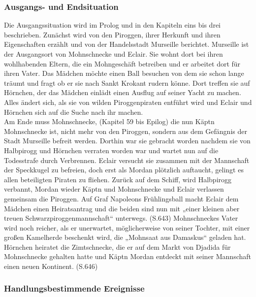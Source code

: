 \subsubsection{Ausgangs- und Endsituation}
Die Ausgangssituation wird im Prolog und in den Kapiteln eins bis drei beschrieben. 
Zunächst wird von den Piroggen, ihrer Herkunft und ihren Eigenschaften erzählt und von der 
Handelsstadt Murseille berichtet. Murseille ist der Ausgangsort von Mohnschnecke und Eclair. 
Sie wohnt dort bei ihren wohlhabenden Eltern, die ein Mohngeschäft betreiben und er arbeitet dort 
für ihren Vater. Das Mädchen möchte einen Ball besuchen von dem sie schon lange träumt und fragt ob 
er sie nach Sankt Krokant rudern könne. Dort treffen sie auf Hörnchen, der das Mädchen einlädt einen 
Ausflug auf seiner Yacht zu machen. Alles ändert sich, als sie von wilden Piroggenpiraten entführt wird 
und Eclair und Hörnchen sich auf die Suche nach ihr machen.
\\
Am Ende muss Mohnschnecke, (Kapitel 59 bis Epilog) die nun Käptn Mohnschnecke ist, nicht mehr von den Piroggen, 
sondern aus dem Gefängnis der Stadt Murseille befreit werden. Dorthin war sie gebracht worden nachdem sie von 
Halbpirogg und Hörnchen verraten worden war und wartet nun auf die Todesstrafe durch Verbrennen. Eclair 
versucht sie zusammen mit der Mannschaft der Speckkugel zu befreien, doch erst als Mordan plötzlich auftaucht, 
gelingt es allen beteiligten Piraten zu fliehen. Zurück auf dem Schiff, wird Halbpirogg verbannt, Mordan wieder 
Käptn und Mohnschnecke und Eclair verlassen gemeinsam die Piroggen. Auf Graf Napoleons Frühlingsball macht Eclair 
dem Mädchen einen Heiratsantrag und die beiden sind nun mit „einer kleinen aber treuen Schwarzpiroggenmannschaft“ 
unterwegs. (S.643) Mohnschneckes Vater wird noch reicher, als er unerwartet, möglicherweise von seiner Tochter, 
mit einer großen Kamelherde beschenkt wird, die „Mohnsaat aus Damaskus“ \cite[S.645]{pir} geladen hat.
Hörnchen heiratet die Zimtschnecke, die er auf dem Markt von Djadida für Mohnschnecke gehalten hatte \cite[S.644]{pir} 
und Käptn Mordan entdeckt mit seiner Mannschaft einen neuen Kontinent. (S.646)


\subsubsection{Handlungsbestimmende Ereignisse}

